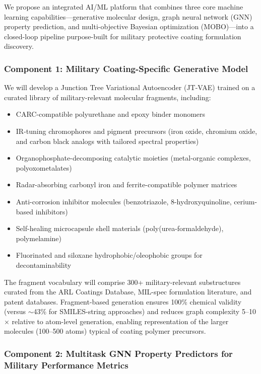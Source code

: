 \documentclass[11pt,letterpaper]{article}
\begin{document}
We propose an integrated AI/ML platform that combines three core machine learning capabilities---generative molecular design, graph neural network (GNN) property prediction, and multi-objective Bayesian optimization (MOBO)---into a closed-loop pipeline purpose-built for military protective coating formulation discovery.

\subsubsection{Component 1: Military Coating-Specific Generative Model}

We will develop a Junction Tree Variational Autoencoder (JT-VAE) trained on a curated library of military-relevant molecular fragments, including:

\begin{itemize}[nosep]
  \item CARC-compatible polyurethane and epoxy binder monomers
  \item IR-tuning chromophores and pigment precursors (iron oxide, chromium oxide, and carbon black analogs with tailored spectral properties)
  \item Organophosphate-decomposing catalytic moieties (metal-organic complexes, polyoxometalates)
  \item Radar-absorbing carbonyl iron and ferrite-compatible polymer matrices
  \item Anti-corrosion inhibitor molecules (benzotriazole, 8-hydroxyquinoline, cerium-based inhibitors)
  \item Self-healing microcapsule shell materials (poly(urea-formaldehyde), polymelamine)
  \item Fluorinated and siloxane hydrophobic/oleophobic groups for decontaminability
\end{itemize}

The fragment vocabulary will comprise 300+ military-relevant substructures curated from the ARL Coatings Database, MIL-spec formulation literature, and patent databases. Fragment-based generation ensures 100\% chemical validity (versus $\sim$43\% for SMILES-string approaches) and reduces graph complexity 5--10$\times$ relative to atom-level generation, enabling representation of the larger molecules (100--500 atoms) typical of coating polymer precursors.

\subsubsection{Component 2: Multitask GNN Property Predictors for Military Performance Metrics}
\end{document}
